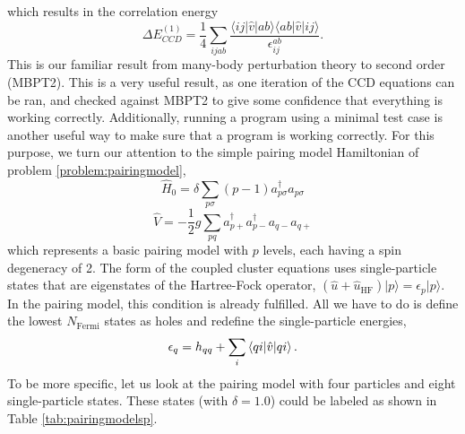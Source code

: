 which results in the correlation energy
  \begin{equation}
  \Delta E_{CCD}^{(1)} = \frac{1}{4} \sum_{ijab}\frac{\langle ij \vert \hat{v} \vert ab \rangle\langle ab \vert \hat{v} \vert ij \rangle}{\epsilon^{ab}_{ij}}.
  \end{equation}
  This is our familiar result from many-body perturbation theory to second order (MBPT2).  This is a very useful result, as one iteration
  of the CCD equations can be ran, and checked against MBPT2 to give
  some confidence that everything is working correctly. Additionally, running a program using a minimal test case is another useful way to make sure that a program is working correctly. For this purpose, we turn our attention to the simple pairing model Hamiltonian of problem \ref{problem:pairingmodel},
  \begin{equation}
  \hat{H}_0 = \delta \sum_{p \sigma} (p-1) a^{\dagger}_{p \sigma} a_{p
    \sigma}\label{eq:sppairing}
  \end{equation}
  \begin{equation}
  \hat{V} = -\frac{1}{2}g \sum_{pq} a^{\dagger}_{p+}a^{\dagger}_{p-}
  a_{q-}a_{q+}\label{eq:intpairing}
  \end{equation}
  which represents a basic pairing model with $p$ levels, each having a
  spin degeneracy of 2. The form of the coupled cluster equations 
  uses single-particle states that are eigenstates of the
  Hartree-Fock operator, $\left(\hat{u}+\hat{u}_{\text{HF}}\right)\vert
  p\rangle=\epsilon_{p}\vert p\rangle$. In the pairing model, this
  condition is already fulfilled. All we have to do is define the
  lowest $N_{\mathrm{\mathrm{Fermi}}}$ states as holes and  redefine the single-particle
  energies,
  \begin{equation}\label{eq:pairingsp}
  \epsilon_q = h_{qq} + \sum_{i} \braket{qi|\hat{v}|qi}.
  \end{equation}
  To be more specific, let us look at the pairing model with four
  particles and eight single-particle states. These states (with $\delta =1.0$) could be labeled as shown in 
Table \ref{tab:pairingmodelsp}.

